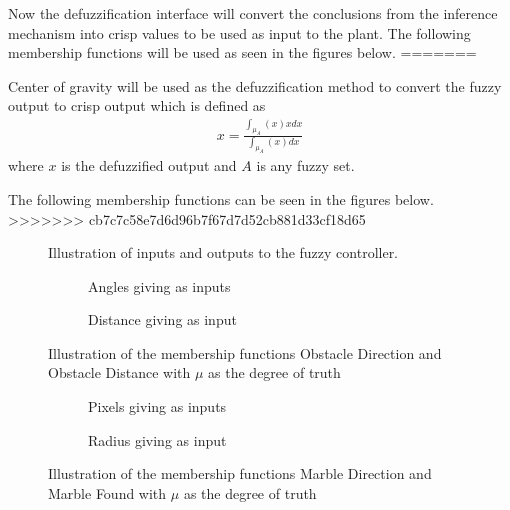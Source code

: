 \documentclass[../Head/Main.tex]{subfiles}
\begin{document}
Now the defuzzification interface will convert the conclusions from the inference mechanism into crisp values to be used as input to the plant. The following membership functions will be used as seen in the figures below.  
=======

Center of gravity will be used as the defuzzification method to convert the fuzzy output to crisp output which is defined as
\begin{align}
 x = \frac{ \int_{\mu_A}(x)xdx }{ \int_{\mu_A} (x) dx }
\end{align}  
where $x$ is the defuzzified output and $A$ is any fuzzy set.\par
The following membership functions can be seen in the figures below.  
>>>>>>> cb7c7c58e7d6d96b7f67d7d52cb881d33cf18d65

\begin{figure}[H]
	\centering
	
	\caption{Illustration of inputs and outputs to the fuzzy controller.}
	\label{fig:MSF_Overview}
\end{figure}

\begin{figure}[H]
	\centering
	\begin{subfigure}[b]{0.49\textwidth}
		\centering
		
		\caption{Angles giving as inputs}
		\label{fig:MSF_Obstacle_direction}
	\end{subfigure}
	\hfill
	\begin{subfigure}[b]{0.49\textwidth}
		
		\vspace{-17pt}
		\caption{Distance giving as input}
		\label{fig:MSF_Obstacle_distance}
	\end{subfigure}
	\caption{Illustration of the membership functions Obstacle Direction and Obstacle Distance with $\mu$ as the degree of truth}
	\label{fig:MSF_Obstacle_dir_dis}
\end{figure}

\begin{figure}[H]
	\centering
	\begin{subfigure}[b]{0.49\textwidth}
		\centering
		
		\caption{Pixels giving as inputs }
		\label{fig:MSF_Marble_direction}
	\end{subfigure}
	\hfill
	\begin{subfigure}[b]{0.49\textwidth}
		
		\caption{Radius giving as input}
		\label{fig:MSF_Marble_found}
	\end{subfigure}
	\caption{Illustration of the membership functions Marble Direction and Marble Found with $\mu$ as the degree of truth}
	\label{fig:MSF_Marble}
\end{figure}
\end{document}
